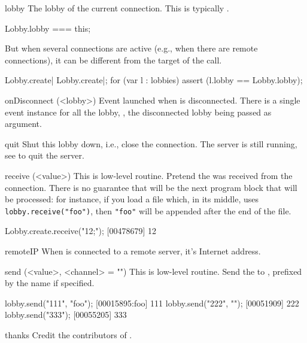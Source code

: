 \begin{urbiscriptapi}
\item[lobby]
  The lobby of the current connection.  This is typically \this.
\begin{urbiassert}
Lobby.lobby === this;
\end{urbiassert}

  But when several connections are active (e.g., when there are remote
  connections), it can be different from the target of the call.

\begin{urbiscript}
Lobby.create| Lobby.create|;
for (var l : lobbies)
  assert (l.lobby == Lobby.lobby);
\end{urbiscript}

\item[onDisconnect](<lobby>)%
  Event launched when \this is disconnected.  There is a single event
  instance for all the lobby, , the
  disconnected lobby being passed as argument.

\item[quit] Shut this lobby down, i.e., close the connection.  The
  server is still running, see  to quit the
  server.

\item[receive](<value>)%
  This is low-level routine.  Pretend the 
   was received from the connection.  There is no guarantee
  that  will be the next program block that will be
  processed: for instance, if you load a file which, in its middle,
  uses \lstinline|lobby.receive("foo")|, then \lstinline|"foo"| will
  be appended after the end of the file.
\begin{urbiscript}
Lobby.create.receive("12;");
[00478679] 12
\end{urbiscript}

\item[remoteIP]
  When \this is connected to a remote server, it's Internet address.

\item[send](<value>, <channel> = "")%
  This is low-level routine.  Send the  
  to \this, prefixed by the 
   name if specified.
\begin{urbiscript}
lobby.send("111", "foo");
[00015895:foo] 111
lobby.send("222", "");
[00051909] 222
lobby.send("333");
[00055205] 333
\end{urbiscript}

\item[thanks] Credit the contributors of \usdk.


\end{urbiscriptapi}
